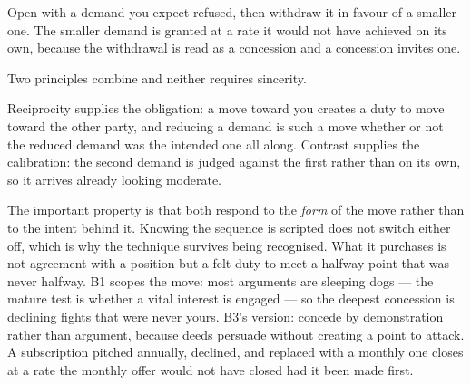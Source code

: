 


\begin{core}
Open with a demand you expect refused, then withdraw it in favour of a smaller one. The smaller demand is granted at a rate it would not have achieved on its own, because the withdrawal is read as a concession and a concession invites one.
\end{core}

\begin{mechanism}
Two principles combine and neither requires sincerity.

Reciprocity supplies the obligation: a move toward you creates a duty to move toward the other party, and reducing a demand is such a move whether or not the reduced demand was the intended one all along. Contrast supplies the calibration: the second demand is judged against the first rather than on its own, so it arrives already looking moderate.

The important property is that both respond to the \emph{form} of the move rather than to the intent behind it. Knowing the sequence is scripted does not switch either off, which is why the technique survives being recognised. What it purchases is not agreement with a position but a felt duty to meet a halfway point that was never halfway. B1 scopes the move: most arguments are sleeping dogs --- the mature test is whether a vital interest is engaged --- so the deepest concession is declining fights that were never yours. B3's version: concede by demonstration rather than argument, because deeds persuade without creating a point to attack.
A subscription pitched annually, declined, and replaced with a monthly one closes at a rate the monthly offer would not have closed had it been made first.
\end{mechanism}


